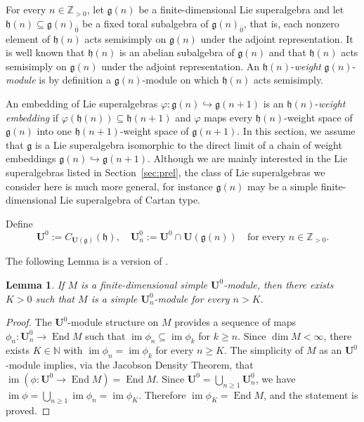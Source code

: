 \documentclass[12pt]{amsart}
\newcommand\Z{\mathbb{Z}}
\newcommand\N{\mathbb{N}}
\newcommand\g{\mathfrak{g}}
\newcommand\fh{\mathfrak{h}}
\newcommand\bU{\mathbf{U}}
\DeclareMathOperator{\im}{im} %
\DeclareMathOperator{\End}{End}
\theoremstyle{plain}
\newtheorem{lem}[theo]{Lemma}
\theoremstyle{definition}
\numberwithin{equation}{section}
\begin{document}
\appendix
\section{ }\label{sec:appendix}
For every $n\in \Z_{>0}$, let $\g(n)$ be a finite-dimensional Lie superalgebra and let $\fh(n)\subseteq \g(n)_{\bar 0}$ be a fixed toral subalgebra of $\g(n)_{\bar 0}$, that is, each nonzero element of $\fh(n)$ acts semisimply on $\g(n)$ under the adjoint representation. It is well known that $\fh(n)$ is an abelian subalgebra of $\g(n)$ and that $\fh(n)$ acts semisimply on $\g(n)$ under the adjoint representation. An $\fh(n)$-\emph{weight} $\g(n)$-\emph{module} is by definition a $\g(n)$-module on which $\fh(n)$ acts semisimply.

An embedding of Lie superalgebras $\varphi:\g(n)\hookrightarrow \g(n+1)$ is an $\fh(n)$-\emph{weight embedding} if $\varphi(\fh(n))\subseteq \fh(n+1)$ and $\varphi$ maps every $\fh(n)$-weight space of $\g(n)$ into one $\fh(n+1)$-weight space of $\g(n+1)$. In this section, we assume that $\g$ is a Lie superalgebra isomorphic to the direct limit of a chain of weight embeddings $\g(n)\hookrightarrow \g(n+1)$. Although we are mainly interested in the Lie superalgebras listed in Section~\ref{sec:prel}, the class of Lie superalgebras we consider here is much more general, for instance $\g(n)$ may be a simple finite-dimensional Lie superalgebra of Cartan type.

Define
	\[
\bU^0:=C_{\bU(\g)}(\fh),\quad \bU_n^0 := \bU^0\cap \bU(\g(n))\quad\text{for every } n\in \Z_{>0}.
	\]

The following Lemma is a version of \cite[Lemma~4.2]{GP20}.

\begin{lem}\label{lem:A1}
If $M$ is a finite-dimensional simple $\bU^0$-module, then there exists $K> 0$ such that $M$ is a simple $\bU_n^0$-module for every $n>K$.
\end{lem}
\begin{proof}
The $\bU^0$-module structure on $M$ provides a sequence of maps $\phi_n:\bU_n^0 \to \End M$ such that $\im \phi_n\subseteq \im \phi_{k}$ for $k\geq n$. Since $\dim M<\infty$, there exists $K\in \N$ with $\im \phi_{n}=\im\phi_{k}$ for every $n\geq K$. The simplicity of $M$ as an $\bU^0$-module implies, via the Jacobson Density Theorem, that $\im (\phi: \bU^0 \to \End M)=\End M$. Since $\bU^0 = \bigcup_{n\geq 1}\bU_n^0$, we have $\im \phi = \bigcup_{n\geq 1}\im \phi_n = \im \phi_K$. Therefore $\im \phi_K=\End M$, and the statement is proved.
\end{proof}
\end{document}
